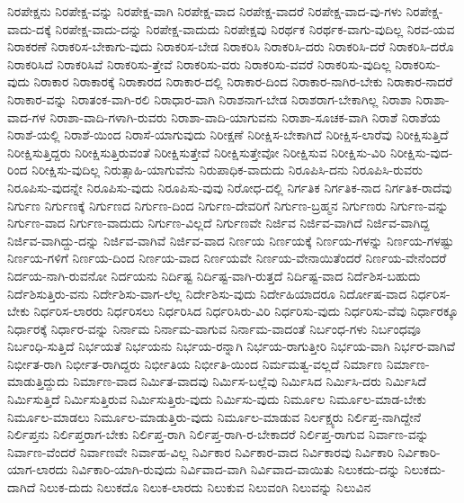 {ನಿರಪೇಕ್ಷನು
ನಿರಪೇಕ್ಷ-ವನ್ನು
ನಿರಪೇಕ್ಷ-ವಾಗಿ
ನಿರಪೇಕ್ಷ-ವಾದ
ನಿರಪೇಕ್ಷ-ವಾದರೆ
ನಿರಪೇಕ್ಷ-ವಾದ-ವು-ಗಳು
ನಿರಪೇಕ್ಷ-ವಾದು-ದಕ್ಕೆ
ನಿರಪೇಕ್ಷ-ವಾದು-ದನ್ನು
ನಿರಪೇಕ್ಷ-ವಾದುದು
ನಿರಪೇಕ್ಷವು
ನಿರರ್ಥಕ
ನಿರರ್ಥಕ-ವಾಗು-ವುದಿಲ್ಲ
ನಿರವ-ಯವ
ನಿರಾಕರಣೆ
ನಿರಾಕರಿಸ-ಬೇಕಾಗು-ವುದು
ನಿರಾಕರಿಸ-ಬೇಡ
ನಿರಾಕರಿಸಿ
ನಿರಾಕರಿಸಿ-ದರು
ನಿರಾಕರಿಸಿ-ದರೆ
ನಿರಾಕರಿಸಿ-ದರೊ
ನಿರಾಕರಿಸಿದೆ
ನಿರಾಕರಿಸಿವೆ
ನಿರಾಕರಿಸು-ತ್ತೇವೆ
ನಿರಾಕರಿಸು-ವರು
ನಿರಾಕರಿಸು-ವವರೆ
ನಿರಾಕರಿಸು-ವುದಿಲ್ಲ
ನಿರಾಕರಿಸು-ವುದು
ನಿರಾಕಾರ
ನಿರಾಕಾರಕ್ಕೆ
ನಿರಾಕಾರದ
ನಿರಾಕಾರ-ದಲ್ಲಿ
ನಿರಾಕಾರ-ದಿಂದ
ನಿರಾಕಾರ-ನಾಗಿರ-ಬೇಕು
ನಿರಾಕಾರ-ನಾದರೆ
ನಿರಾಕಾರ-ವನ್ನು
ನಿರಾತಂಕ-ವಾಗಿ-ರಲಿ
ನಿರಾಧಾರ-ವಾಗಿ
ನಿರಾಶನಾಗ-ಬೇಡ
ನಿರಾಶರಾಗ-ಬೇಕಾಗಿಲ್ಲ
ನಿರಾಶಾ
ನಿರಾಶಾ-ವಾದ-ಗಳ
ನಿರಾಶಾ-ವಾದಿ-ಗಳಾಗಿ-ರುವರು
ನಿರಾಶಾ-ವಾದಿ-ಯಾಗುವನು
ನಿರಾಶಾ-ಸೂಚಕ-ವಾಗಿ
ನಿರಾಶೆ
ನಿರಾಶೆಯ
ನಿರಾಶೆ-ಯಲ್ಲಿ
ನಿರಾಶೆ-ಯಿಂದ
ನಿರಾಸೆ-ಯಾಗುವುದು
ನಿರೀಕ್ಷಣೆ
ನಿರೀಕ್ಷಿಸ-ಬೇಕಾಗಿದೆ
ನಿರೀಕ್ಷಿಸ-ಲಾರೆವು
ನಿರೀಕ್ಷಿಸುತ್ತಿದೆ
ನಿರೀಕ್ಷಿಸುತ್ತಿದ್ದರು
ನಿರೀಕ್ಷಿಸುತ್ತಿರುವಂತೆ
ನಿರೀಕ್ಷಿಸುತ್ತೇವೆ
ನಿರೀಕ್ಷಿಸುತ್ತೇವೋ
ನಿರೀಕ್ಷಿಸುವ
ನಿರೀಕ್ಷಿಸು-ವಿರಿ
ನಿರೀಕ್ಷಿಸು-ವುದ-ರಿಂದ
ನಿರೀಕ್ಷಿಸು-ವುದಿಲ್ಲ
ನಿರುತ್ಸಾಹಿ-ಯಾಗುವೆನು
ನಿರುಪಾಧಿಕ-ವಾದುದು
ನಿರೂಪಿಸಿ-ದನು
ನಿರೂಪಿಸಿ-ರುವರು
ನಿರೂಪಿಸು-ವುದನ್ನೇ
ನಿರೂಪಿಸು-ವುದು
ನಿರೂಪಿಸು-ವುವು
ನಿರೋಧ-ದಲ್ಲಿ
ನಿರ್ಗತಿಕ
ನಿರ್ಗತಿಕ-ನಾದ
ನಿರ್ಗತಿಕ-ರಾದೆವು
ನಿರ್ಗುಣ
ನಿರ್ಗುಣಕ್ಕೆ
ನಿರ್ಗುಣದ
ನಿರ್ಗುಣ-ದಿಂದ
ನಿರ್ಗುಣ-ದೇವರಿಗೆ
ನಿರ್ಗುಣ-ಬ್ರಹ್ಮನ
ನಿರ್ಗುಣರು
ನಿರ್ಗುಣ-ವನ್ನು
ನಿರ್ಗುಣ-ವಾದ
ನಿರ್ಗುಣ-ವಾದುದು
ನಿರ್ಗುಣ-ವಿಲ್ಲದೆ
ನಿರ್ಗುಣವೇ
ನಿರ್ಜಿವ
ನಿರ್ಜಿವ-ವಾಗಿದೆ
ನಿರ್ಜಿವ-ವಾಗಿದ್ದ
ನಿರ್ಜಿವ-ವಾಗಿದ್ದು-ದನ್ನು
ನಿರ್ಜಿವ-ವಾಗಿವೆ
ನಿರ್ಜಿವ-ವಾದ
ನಿರ್ಣಯ
ನಿರ್ಣಯಕ್ಕೆ
ನಿರ್ಣಯ-ಗಳನ್ನು
ನಿರ್ಣಯ-ಗಳಷ್ಟು
ನಿರ್ಣಯ-ಗಳಿಗೆ
ನಿರ್ಣಯ-ದಿಂದ
ನಿರ್ಣಯ-ವಾದ
ನಿರ್ಣಯವೇ
ನಿರ್ಣಯ-ವೇನಾಯಿತೆಂದರೆ
ನಿರ್ಣಯ-ವೇನೆಂದರೆ
ನಿರ್ದಯ-ನಾಗಿ-ರುವನೋ
ನಿರ್ದಯನು
ನಿರ್ದಿಷ್ಟ
ನಿರ್ದಿಷ್ಟ-ವಾಗಿ-ರುತ್ತದೆ
ನಿರ್ದಿಷ್ಟ-ವಾದ
ನಿರ್ದೆಶಿಸ-ಬಹುದು
ನಿರ್ದೆಶಿಸುತ್ತಿರು-ವನು
ನಿರ್ದೇಶಿಸು-ವಾಗ-ಲೆಲ್ಲ
ನಿರ್ದೇಶಿಸು-ವುದು
ನಿರ್ದೇಹಿಯಾದರೂ
ನಿರ್ದೋಷ-ವಾದ
ನಿರ್ಧರಿಸ-ಬೇಕು
ನಿರ್ಧರಿಸ-ಲಾರರು
ನಿರ್ಧರಿಸಲು
ನಿರ್ಧರಿಸಿದ
ನಿರ್ಧರಿಸಿರು-ವಿರಿ
ನಿರ್ಧರಿಸು-ವುದು
ನಿರ್ಧರಿಸು-ವೆವು
ನಿರ್ಧಾರಕ್ಕೂ
ನಿರ್ಧಾರಕ್ಕೆ
ನಿರ್ಧಾರ-ವನ್ನು
ನಿರ್ನಾಮ
ನಿರ್ನಾಮ-ವಾಗುವ
ನಿರ್ನಾಮ-ವಾದಂತೆ
ನಿರ್ಬಂಧ-ಗಳು
ನಿರ್ಬಂಧವೂ
ನಿರ್ಬಂಧಿ-ಸುತ್ತಿದೆ
ನಿರ್ಭಯತೆ
ನಿರ್ಭಯನು
ನಿರ್ಭಯ-ರನ್ನಾಗಿ
ನಿರ್ಭಯ-ರಾಗುತ್ತೀರಿ
ನಿರ್ಭಯ-ವಾಗಿ
ನಿರ್ಭರ-ವಾಗಿವೆ
ನಿರ್ಭೀತ-ರಾಗಿ
ನಿರ್ಭೀತ-ರಾಗಿದ್ದರು
ನಿರ್ಭೀತಿಯ
ನಿರ್ಭೀತಿ-ಯಿಂದ
ನಿರ್ಮಮತ್ವ-ವಲ್ಲದೆ
ನಿರ್ಮಾಣ
ನಿರ್ಮಾಣ-ಮಾಡುತ್ತಿದ್ದುದು
ನಿರ್ಮಾಣ-ವಾದ
ನಿರ್ಮಿತ-ವಾದವು
ನಿರ್ಮಿಸ-ಬಲ್ಲೆವು
ನಿರ್ಮಿಸಿದ
ನಿರ್ಮಿಸಿ-ದರು
ನಿರ್ಮಿಸಿದೆ
ನಿರ್ಮಿಸುತ್ತಿದೆ
ನಿರ್ಮಿಸುತ್ತಿರುವ
ನಿರ್ಮಿಸುತ್ತಿರು-ವುದು
ನಿರ್ಮಿಸು-ವುದು
ನಿರ್ಮೂಲ
ನಿರ್ಮೂಲ-ಮಾಡ-ಬೇಕು
ನಿರ್ಮೂಲ-ಮಾಡಲು
ನಿರ್ಮೂಲ-ಮಾಡುತ್ತಿರು-ವುದು
ನಿರ್ಮೂಲ-ಮಾಡುವ
ನಿರ್ಲಕ್ಷ್ಯರು
ನಿರ್ಲಿಪ್ತ-ನಾಗಿದ್ದೇನೆ
ನಿರ್ಲಿಪ್ತನು
ನಿರ್ಲಿಪ್ತರಾಗ-ಬೇಕು
ನಿರ್ಲಿಪ್ತ-ರಾಗಿ
ನಿರ್ಲಿಪ್ತ-ರಾಗಿ-ರ-ಬೇಕಾದರೆ
ನಿರ್ಲಿಪ್ತ-ರಾಗುವ
ನಿರ್ವಾಣ-ವನ್ನು
ನಿರ್ವಾಣ-ವೆಂದರೆ
ನಿರ್ವಾಣವೇ
ನಿರ್ವಾಹ-ವಿಲ್ಲ
ನಿರ್ವಿಕಾರ
ನಿರ್ವಿಕಾರ-ವಾದ
ನಿರ್ವಿಕಾರವು
ನಿರ್ವಿಕಾರಿ
ನಿರ್ವಿಕಾರಿ-ಯಾಗ-ಲಾರದು
ನಿರ್ವಿಕಾರಿ-ಯಾಗಿ-ರುವುದು
ನಿರ್ವಿವಾದ-ವಾಗಿ
ನಿರ್ವಿವಾದ-ವಾಯಿತು
ನಿಲುಕದು-ದನ್ನು
ನಿಲುಕದು-ದಾಗಿದೆ
ನಿಲುಕ-ದುದು
ನಿಲುಕದೊ
ನಿಲುಕ-ಲಾರದು
ನಿಲುಕುವ
ನಿಲುವಂಗಿ
ನಿಲುವನ್ನು
ನಿಲುವಿನ
}
